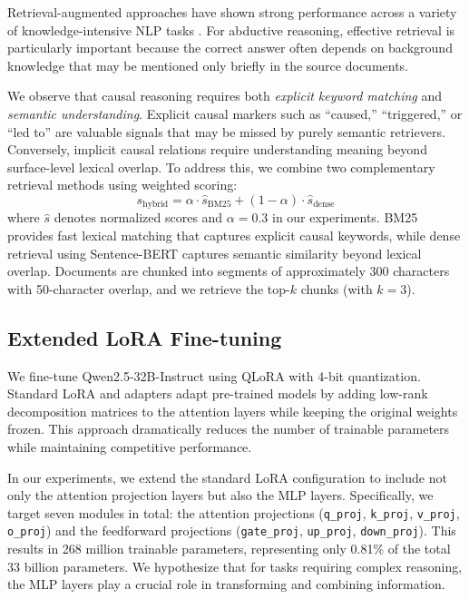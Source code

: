 \documentclass[11pt]{article}
\begin{document}
Retrieval-augmented approaches have shown strong performance across a variety of knowledge-intensive NLP tasks \cite{lewis2020rag,guu2020realm}. For abductive reasoning, effective retrieval is particularly important because the correct answer often depends on background knowledge that may be mentioned only briefly in the source documents.

We observe that causal reasoning requires both \textit{explicit keyword matching} and \textit{semantic understanding}. Explicit causal markers such as ``caused,'' ``triggered,'' or ``led to'' are valuable signals that may be missed by purely semantic retrievers. Conversely, implicit causal relations require understanding meaning beyond surface-level lexical overlap. To address this, we combine two complementary retrieval methods using weighted scoring:
\begin{equation}
    s_{\text{hybrid}} = \alpha \cdot \hat{s}_{\text{BM25}} + (1-\alpha) \cdot \hat{s}_{\text{dense}}
\end{equation}
where $\hat{s}$ denotes normalized scores and $\alpha = 0.3$ in our experiments. BM25 \cite{robertson2009probabilistic} provides fast lexical matching that captures explicit causal keywords, while dense retrieval using Sentence-BERT \cite{reimers2019sentence,gao2021simcse,zhang2022mcse} captures semantic similarity beyond lexical overlap. Documents are chunked into segments of approximately 300 characters with 50-character overlap, and we retrieve the top-$k$ chunks (with $k=3$).

\subsection{Extended LoRA Fine-tuning}
\label{sec:lora}

We fine-tune Qwen2.5-32B-Instruct \cite{qwen2024} using QLoRA \cite{dettmers2023qlora} with 4-bit quantization. Standard LoRA \cite{hu2022lora} and adapters \cite{houlsby2019parameter} adapt pre-trained models by adding low-rank decomposition matrices to the attention layers while keeping the original weights frozen. This approach dramatically reduces the number of trainable parameters while maintaining competitive performance.

In our experiments, we extend the standard LoRA configuration to include not only the attention projection layers but also the MLP layers. Specifically, we target seven modules in total: the attention projections (\texttt{q\_proj}, \texttt{k\_proj}, \texttt{v\_proj}, \texttt{o\_proj}) and the feedforward projections (\texttt{gate\_proj}, \texttt{up\_proj}, \texttt{down\_proj}). This results in 268 million trainable parameters, representing only 0.81\% of the total 33 billion parameters. We hypothesize that for tasks requiring complex reasoning, the MLP layers play a crucial role in transforming and combining information.
\end{document}
